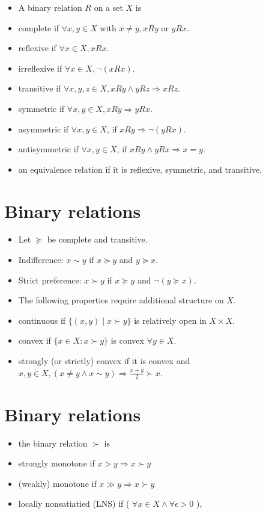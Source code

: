 \documentclass[10pt]{article}
\begin{document}
\begin{itemize}
  \item A binary relation $R$ on a set $X$ is
  \item complete if $\forall x, y \in X$ with $x \neq y, x R y$ or $y R x$.
  \item reflexive if $\forall x \in X, x R x$.
  \item irreflexive if $\forall x \in X, \neg(x R x)$.
  \item transitive if $\forall x, y, z \in X, x R y \wedge y R z \Longrightarrow x R z$.
  \item symmetric if $\forall x, y \in X, x R y \Longrightarrow y R x$.
  \item asymmetric if $\forall x, y \in X$, if $x R y \Longrightarrow \neg(y R x)$.
  \item antisymmetric if $\forall x, y \in X$, if $x R y \wedge y R x \Longrightarrow x=y$.
  \item an equivalence relation if it is reflexive, symmetric, and transitive.
\end{itemize}

\section*{Binary relations}
\begin{itemize}
  \item Let $\succeq$ be complete and transitive.
  \item Indifference: $x \sim y$ if $x \succeq y$ and $y \succeq x$.
  \item Strict preference: $x \succ y$ if $x \succeq y$ and $\neg(y \succeq x)$.
  \item The following properties require additional structure on $X$.
  \item continuous if $\{(x, y) \mid x \succ y\}$ is relatively open in $X \times X$.
  \item convex if $\{x \in X: x \succ y\}$ is convex $\forall y \in X$.
  \item strongly (or strictly) convex if it is convex and $x, y \in X,(x \neq y \wedge x \sim y) \Longrightarrow \frac{x+y}{2} \succ x$.
\end{itemize}

\section*{Binary relations}
\begin{itemize}
  \item the binary relation $\succ$ is
  \item strongly monotone if $x>y \Longrightarrow x \succ y$
  \item (weakly) monotone if $x \gg y \Longrightarrow x \succ y$
  \item locally nonsatiatied (LNS) if ( $\forall x \in X \wedge \forall \epsilon>0$ ),
\end{itemize}
\end{document}
